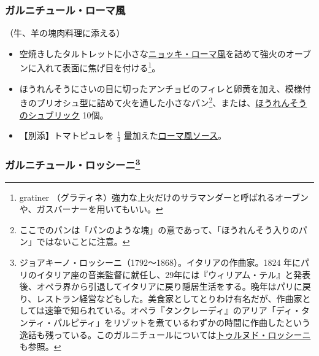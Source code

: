 \begin{recette}
\atoaki{}

\hypertarget{garniture-a-la-romaine}{%
\subsubsection{ガルニチュール・ローマ風}\label{garniture-a-la-romaine}}



（牛、羊の塊肉料理に添える）

\begin{itemize}
\item
  空焼きしたタルトレットに小さな\protect\hyperlink{gnokis-a-la-romaine}{ニョッキ・ローマ風}を詰めて強火のオーブンに入れて表面に焦げ目を付ける\footnote{gratiner
    （グラティネ）強力な上火だけのサラマンダーと呼ばれるオーブンや、ガスバーナーを用いてもいい。}。
\item
  ほうれんそうにさいの目に切ったアンチョビのフィレと卵黄を加え、模様付きのブリオシュ型に詰めて火を通した小さなパン\footnote{ここでのパンは「パンのような塊」の意であって、「ほうれんそう入りのパン」ではないことに注意。}、または、\protect\hyperlink{subric-d-epinards}{ほうれんそうのシュブリック}
  10個。
\item
  【別添】トマトピュレを \(\frac{1}{3}\)
  量加えた\protect\hyperlink{sauce-romaine}{ローマ風ソース}。
\end{itemize}

\atoaki{}

\hypertarget{garniture-rossini}{%
\subsubsection[ガルニチュール・ロッシーニ]{\texorpdfstring{ガルニチュール・ロッシーニ\footnote{ジョアキーノ・ロッシーニ（1792〜1868）。イタリアの作曲家。1824
  年にパリのイタリア座の音楽監督に就任し、29年には『ウィリアム・テル』と発表後、オペラ界から引退してイタリアに戻り隠居生活をする。晩年はパリに戻り、レストラン経営などもした。美食家としてとりわけ有名だが、作曲家としては速筆で知られている。オペラ『タンクレーディ』のアリア「ディ・タンティ・パルピティ」をリゾットを煮ているわずかの時間に作曲したという逸話も残っている。このガルニチュールについては\protect\hyperlink{tournedos-rossini}{トゥルヌド・ロッシーニ}も参照。}}{ガルニチュール・ロッシーニ}}\label{garniture-rossini}}


\end{recette}
